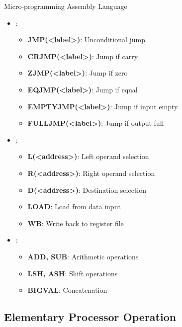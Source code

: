 \begin{frame}{Micro-programming Assembly Language}
\begin{itemize}
\item {}:
\begin{itemize}
\item \textbf{JMP(<label>)}: Unconditional jump
\item \textbf{CRJMP(<label>)}: Jump if carry
\item \textbf{ZJMP(<label>)}: Jump if zero
\item \textbf{EQJMP(<label>)}: Jump if equal
\item \textbf{EMPTYJMP(<label>)}: Jump if input empty
\item \textbf{FULLJMP(<label>)}: Jump if output full
\end{itemize}
\vspace{0.3cm}
\item {}:
\begin{itemize}
\item \textbf{L(<address>)}: Left operand selection
\item \textbf{R(<address>)}: Right operand selection
\item \textbf{D(<address>)}: Destination selection
\item \textbf{LOAD}: Load from data input
\item \textbf{WB}: Write back to register file
\end{itemize}
\vspace{0.3cm}
\item {}:
\begin{itemize}
\item \textbf{ADD, SUB}: Arithmetic operations
\item \textbf{LSH, ASH}: Shift operations
\item \textbf{BIGVAL}: Concatenation
\end{itemize}
\end{itemize}
\end{frame}

\subsection{Elementary Processor Operation}

